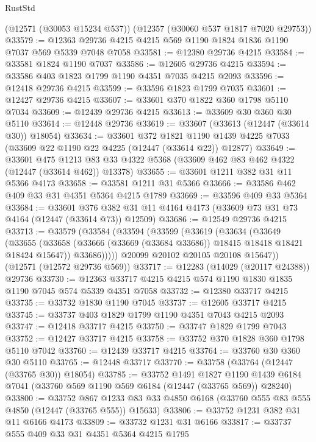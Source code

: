\begin{lexlean}{RustStd}
\begin{coremodule}
    (@12571 (@30053 @15234 @537))
    (@12357 (@30060 @537 @1817 @7020 @29753))
@33579 := @12363 @29736 @4215 @4215 @569 @1190 @1824 @1836 @1190 @7037 @569 @5339 @7048 @7058
@33581 := @12380 @29736 @4215
@33584 := @33581 @1824 @1190 @7037
@33586 := @12605 @29736 @4215
@33594 := @33586 @403 @1823 @1799 @1190 @4351 @7035 @4215 @2093
@33596 := @12418 @29736 @4215
@33599 := @33596 @1823 @1799 @7035
@33601 := @12427 @29736 @4215
@33607 := @33601 @370 @1822 @360 @1798 @5110 @7034
@33609 := @12439 @29736 @4215
@33613 := @33609 @30 @360 @30 @5110
@33614 := @12448 @29736
@33619 := @33607 (@33613 (@12447 (@33614 @30)) @18054)
@33634 := @33601
    @372
    @1821
    @1190
    @1439
    @4225
    @7033
    (@33609 @22 @1190 @22 @4225 (@12447 (@33614 @22)) @12877)
@33649 := @33601
    @475
    @1213
    @83
    @33
    @4322
    @5368
    (@33609 @462 @83 @462 @4322 (@12447 (@33614 @462)) @13378)
@33655 := @33601 @1211 @382 @31 @11 @5366 @4173
@33658 := @33581 @1211 @31 @5366
@33666 := @33586 @462 @409 @33 @31 @4351 @5364 @4215 @1789
@33669 := @33596 @409 @33 @5364
@33684 := @33601
    @376
    @382
    @31
    @11
    @4164
    @4173
    (@33609 @73 @31 @73 @4164 (@12447 (@33614 @73)) @12509)
@33686 := @12549 @29736 @4215
@33713 := @33579
    (@33584
      (@33594
        (@33599
          (@33619
            (@33634
              (@33649
                (@33655
                  (@33658 (@33666 (@33669 (@33684 @33686)) @18415 @18418 @18421 @18424 @15647))
                  @33686)))))
        @20099
        @20102
        @20105
        @20108
        @15647))
    (@12571 (@12572 @29736 @569))
@33717 := @12283 (@14029 (@20117 @24388)) @29736
@33730 := @12363 @33717 @4215 @4215 @574 @1190 @1830 @1835 @1190 @7045 @574 @5339 @4351 @7058
@33732 := @12380 @33717 @4215
@33735 := @33732 @1830 @1190 @7045
@33737 := @12605 @33717 @4215
@33745 := @33737 @403 @1829 @1799 @1190 @4351 @7043 @4215 @2093
@33747 := @12418 @33717 @4215
@33750 := @33747 @1829 @1799 @7043
@33752 := @12427 @33717 @4215
@33758 := @33752 @370 @1828 @360 @1798 @5110 @7042
@33760 := @12439 @33717 @4215
@33764 := @33760 @30 @360 @30 @5110
@33765 := @12448 @33717
@33770 := @33758 (@33764 (@12447 (@33765 @30)) @18054)
@33785 := @33752
    @1491
    @1827
    @1190
    @1439
    @6184
    @7041
    (@33760 @569 @1190 @569 @6184 (@12447 (@33765 @569)) @28240)
@33800 := @33752
    @867
    @1233
    @83
    @33
    @4850
    @6168
    (@33760 @555 @83 @555 @4850 (@12447 (@33765 @555)) @15633)
@33806 := @33752 @1231 @382 @31 @11 @6166 @4173
@33809 := @33732 @1231 @31 @6166
@33817 := @33737 @555 @409 @33 @31 @4351 @5364 @4215 @1795

\end{coremodule}
\end{lexlean}
